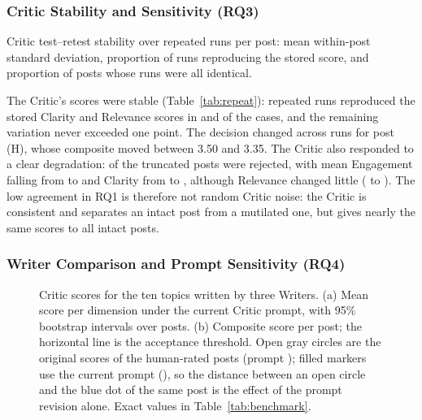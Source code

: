 \documentclass[a4paper,twoside]{article}
\begin{document}
\subsubsection{Critic Stability and Sensitivity (RQ3)}

\begin{table}[t]
\centering
\caption{Critic test--retest stability over \RepRuns{} repeated runs per post: mean within-post standard deviation, proportion of runs reproducing the stored score, and proportion of posts whose runs were all identical.}
\label{tab:repeat}
\begin{adjustbox}{max width=\columnwidth}

\end{adjustbox}
\end{table}

The Critic's scores were stable (Table~\ref{tab:repeat}): repeated runs reproduced the stored Clarity and Relevance scores in \RepEqualCla{} and \RepEqualRel{} of the cases, and the remaining variation never exceeded one point. The decision changed across runs for \RepFlips{} post (H), whose composite moved between 3.50 and 3.35. The Critic also responded to a clear degradation: \TruncReject{} of the truncated posts were rejected, with mean Engagement falling from \RepMeanEng{} to \TruncMeanEng{} and Clarity from \RepMeanCla{} to \TruncMeanCla{}, although Relevance changed little (\RepMeanRel{} to \TruncMeanRel{}). The low agreement in RQ1 is therefore not random Critic noise: the Critic is consistent and separates an intact post from a mutilated one, but gives nearly the same scores to all intact posts.

\subsubsection{Writer Comparison and Prompt Sensitivity (RQ4)}

\begin{figure}[t]
\centering

\caption{Critic scores for the ten topics written by three Writers. (a) Mean score per dimension under the current Critic prompt, with 95\% bootstrap intervals over posts. (b) Composite score per post; the horizontal line is the acceptance threshold. Open gray circles are the original scores of the human-rated posts (prompt \BmOldHash{}); filled markers use the current prompt (\BmNewHash{}), so the distance between an open circle and the blue dot of the same post is the effect of the prompt revision alone. Exact values in Table~\ref{tab:benchmark}.}
\label{fig:benchmark}
\end{figure}
\end{document}
